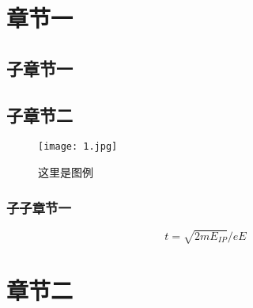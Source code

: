 \section{章节一}
\pagestyle{plain}
\setcounter{page}{1}%
\subsection{子章节一}
\cite{page1}
\subsection{子章节二}
\begin{figure}[h]
\centering
 \texttt{[image: 1.jpg]}
 \caption{这里是图例}
\end{figure}
\cite{page2}
\subsubsection{子子章节一}
\begin{equation}
t=\sqrt{2mE_{IP}}/{eE}
\end{equation}
\cite{page3}
\section{章节二}
\cite{page4}
